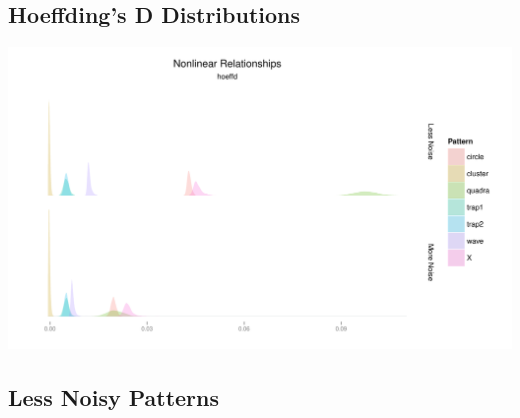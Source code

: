 \documentclass[english,nohyper,titlepage]{tufte-handout}\usepackage{graphicx, color}
\begin{document}
\subsection{Hoeffding's D Distributions}
\includegraphics[scale=.5]{images/NonlinearDensitieshoeffd}


\newpage
\subsection{Less Noisy Patterns}
\end{document}
